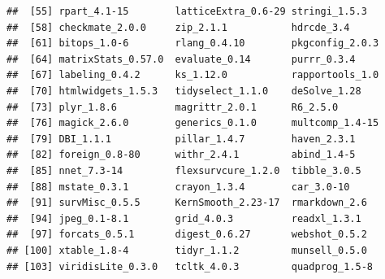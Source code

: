 \documentclass[
]{article}
\begin{document}
\begin{verbatim}
##  [55] rpart_4.1-15        latticeExtra_0.6-29 stringi_1.5.3      
##  [58] checkmate_2.0.0     zip_2.1.1           hdrcde_3.4         
##  [61] bitops_1.0-6        rlang_0.4.10        pkgconfig_2.0.3    
##  [64] matrixStats_0.57.0  evaluate_0.14       purrr_0.3.4        
##  [67] labeling_0.4.2      ks_1.12.0           rapportools_1.0    
##  [70] htmlwidgets_1.5.3   tidyselect_1.1.0    deSolve_1.28       
##  [73] plyr_1.8.6          magrittr_2.0.1      R6_2.5.0           
##  [76] magick_2.6.0        generics_0.1.0      multcomp_1.4-15    
##  [79] DBI_1.1.1           pillar_1.4.7        haven_2.3.1        
##  [82] foreign_0.8-80      withr_2.4.1         abind_1.4-5        
##  [85] nnet_7.3-14         flexsurvcure_1.2.0  tibble_3.0.5       
##  [88] mstate_0.3.1        crayon_1.3.4        car_3.0-10         
##  [91] survMisc_0.5.5      KernSmooth_2.23-17  rmarkdown_2.6      
##  [94] jpeg_0.1-8.1        grid_4.0.3          readxl_1.3.1       
##  [97] forcats_0.5.1       digest_0.6.27       webshot_0.5.2      
## [100] xtable_1.8-4        tidyr_1.1.2         munsell_0.5.0      
## [103] viridisLite_0.3.0   tcltk_4.0.3         quadprog_1.5-8
\end{verbatim}
\end{document}
